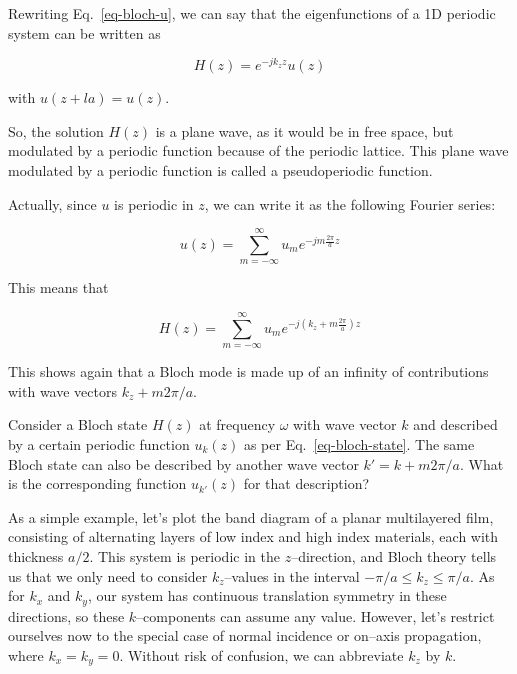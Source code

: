 Rewriting Eq.~\ref{eq-bloch-u}, we can say that the eigenfunctions of a 1D periodic system can be written as

\begin{equation}
H(z) = e^{-j k_z z} u(z) \label{eq-bloch-state}
\end{equation} 

with $u(z+l a) = u(z)$.

So, the solution $H(z)$ is a plane wave, as it would be in free space, but modulated by a periodic function because of the periodic lattice. This plane wave modulated by a periodic function is called a pseudoperiodic function.

Actually, since $u$ is periodic in $z$, we can write it as the following Fourier series:

\begin{equation}
u(z) =  \sum_{m=-\infty}^{\infty} u_m {e^{-j m \frac{2 \pi}{a} z}}
\end{equation} 

This means that

\begin{equation}
H(z)=  \sum_{m=-\infty}^{\infty} u_m {e^{-j \left( k_z + m \frac{2 \pi}{a} \right) z}}
\end{equation} 

This shows again that a Bloch mode is made up of an infinity of contributions with wave vectors $k_z + m 2 \pi / a$.


\begin{exer}
Consider a Bloch state $H(z)$ at frequency $\omega$ with wave vector $k$ and described by a certain periodic function $u_k(z)$ as per Eq.~\ref{eq-bloch-state}. The same Bloch state can also be described by another wave vector $k' = k+m 2 \pi / a$. What is the corresponding function $u_{k'}(z)$ for that description?
\end{exer}


\pagebreak


As a simple example, let's plot the band diagram of a planar multilayered film, consisting of alternating layers of low index and high index materials, each with thickness $a/2$. This system is periodic in the $z$--direction, and Bloch theory tells us that we only need to consider $k_z$--values in the interval $-\pi / a \le k_z \le \pi / a$. As for $k_x$ and $k_y$, our system has continuous translation symmetry in these directions, so these $k$--components can assume any value. However, let's restrict ourselves now to the special case of normal incidence or on--axis propagation, where $k_x=k_y=0$. Without risk of confusion, we can abbreviate $k_z$ by $k$.

